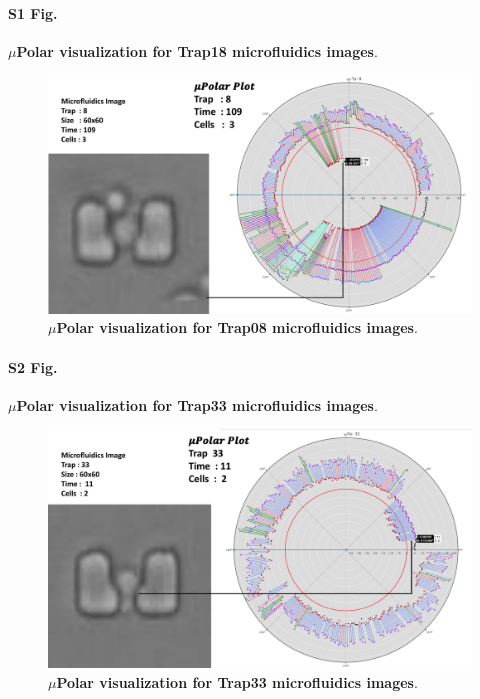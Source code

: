 \documentclass[conference]{IEEEtran}
\begin{document}
\paragraph*{S1 Fig.}
\label{S1_Fig}
{\bf  $\mu$Polar visualization for Trap18 microfluidics images}. 


\begin{figure}
\centering
\includegraphics[width=\textwidth,height=10 cm]{Patterns/bc8tp8.pdf}
\caption{ \textbf{$\mu$Polar visualization for Trap08 microfluidics images}.}
\label{S1_Fig}
\end{figure}


\paragraph*{S2 Fig.}
\label{S2_Fig}
{\bf  $\mu$Polar visualization for Trap33 microfluidics images}. 

\begin{figure}
\centering
\includegraphics[width=\textwidth,height=10 cm]{Patterns/bc8tp33.pdf}
\caption{  \textbf{$\mu$Polar visualization for Trap33 microfluidics images}.}
\label{S2_Fig}
\end{figure}
\end{document}
